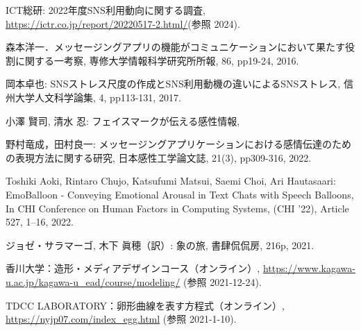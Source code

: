 \documentclass[11pt,a4paper]{ltjsreport}
\begin{document}
\begin{thebibliography}{99} %

    ICT総研: 2022年度SNS利用動向に関する調査,
    \url{https://ictr.co.jp/report/20220517-2.html/}(参照 2024).

    森本洋一．メッセージングアプリの機能がコミュニケーションにおいて果たす役割に関する一考察,
    専修大学情報科学研究所所報, 86, pp19-24, 2016.

    岡本卓也: SNSストレス尺度の作成とSNS利用動機の違いによるSNSストレス,
    信州大学人文科学論集, 4, pp113-131, 2017.

    小澤 賢司, 清水 忍: フェイスマークが伝える感性情報,

    野村竜成，田村良一: メッセージングアプリケーションにおける感情伝達のための表現方法に関する研究,
    日本感性工学論文誌, 21(3), pp309-316, 2022.

    Toshiki Aoki, Rintaro Chujo, Katsufumi Matsui, Saemi Choi, Ari Hautasaari:
    EmoBalloon - Conveying Emotional Arousal in Text Chats with Speech Balloons,
    In CHI Conference on Human Factors in Computing Systems, (CHI '22), Article 527, 1–16, 2022.


    ジョゼ・サラマーゴ, 木下 眞穂（訳）: 象の旅, 書肆侃侃房, 216p, 2021.

    香川大学：造形・メディアデザインコース（オンライン）, \url{https://www.kagawa-u.ac.jp/kagawa-u_ead/course/modeling/} (参照 2021-12-24).

    TDCC LABORATORY：卵形曲線を表す方程式（オンライン）, \url{https://nyjp07.com/index_egg.html} (参照 2021-1-10).

\end{thebibliography}

\newpage
\appendix         %
\pagestyle{fancy}
\fancyhead{} %
\renewcommand{\chaptermark}[1]{\lhead{付録\ \thechapter\ ~~~#1}{}}
\chead{} %
\rhead{\thepage} %
\lfoot{} %
\cfoot{} %
\renewcommand{\footrulewidth}{0.5pt} %
\end{document}
